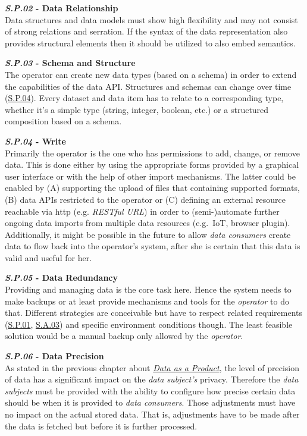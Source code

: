 \documentclass[12pt,english,a4paper,titlepage,cleardoublepage=empty,dottedtoc]{report}
\begin{document}
\textbf{\emph{\protect\hypertarget{sp02}{}{S.P.02}} - Data
Relationship}\\
Data structures and data models must show high flexibility and may not
consist of strong relations and serration. If the syntax of the data
representation also provides structural elements then it should be
utilized to also embed semantics.

\textbf{\emph{\protect\hypertarget{sp03}{}{S.P.03}} - Schema and
Structure}\\
The operator can create new data types (based on a schema) in order to
extend the capabilities of the data API. Structures and schemas can
change over time (\protect\hyperlink{sp04}{S.P.04}). Every dataset and
data item has to relate to a corresponding type, whether it's a simple
type (string, integer, boolean, etc.) or a structured composition based
on a schema.

\textbf{\emph{\protect\hypertarget{sp04}{}{S.P.04}} - Write}\\
Primarily the operator is the one who has permissions to add, change, or
remove data. This is done either by using the appropriate forms provided
by a graphical user interface or with the help of other import
mechanisms. The latter could be enabled by (A) supporting the upload of
files that containing supported formats, (B) data APIs restricted to the
operator or (C) defining an external resource reachable via http (e.g.
\emph{RESTful URL}) in order to (semi-)automate further ongoing data
imports from multiple data resources (e.g.~IoT, browser plugin).
Additionally, it might be possible in the future to allow \emph{data
consumers} create data to flow back into the operator's system, after
she is certain that this data is valid and useful for her.

\textbf{\emph{\protect\hypertarget{sp05}{}{S.P.05}} - Data Redundancy}\\
Providing and managing data is the core task here. Hence the system
needs to make backups or at least provide mechanisms and tools for the
\emph{operator} to do that. Different strategies are conceivable but
have to respect related requirements (\protect\hyperlink{sp01}{S.P.01},
\protect\hyperlink{sa03}{S.A.03}) and specific environment conditions
though. The least feasible solution would be a manual backup only
allowed by the \emph{operator}.

\textbf{\emph{\protect\hypertarget{sp06}{}{S.P.06}} - Data Precision}\\
As stated in the previous chapter about
\emph{\protect\hyperlink{personal-data-as-a-product}{Data as a
Product}}, the level of precision of data has a significant impact on
the \emph{data subject's} privacy. Therefore the \emph{data subjects}
must be provided with the ability to configure how precise certain data
should be when it is provided to \emph{data consumers}. Those
adjustments must have no impact on the actual stored data. That is,
adjustments have to be made after the data is fetched but before it is
further processed.
\end{document}
